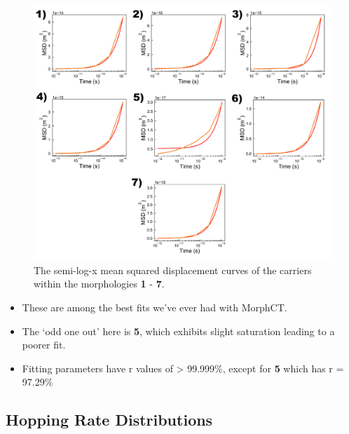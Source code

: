 \documentclass[12pt]{article}
\begin{document}
\begin{figure}[h!]\centering
	\includegraphics[width=\textwidth]{Figures/SemiLogMSDHole.pdf}
    \caption{The semi-log-x mean squared displacement curves of the carriers within the morphologies \textbf{1} - \textbf{7}.}
	\label{fig:MSD}
\end{figure}

\begin{itemize}
    \item{These are among the best fits we've ever had with MorphCT.}
    \item{The `odd one out' here is \textbf{5}, which exhibits slight saturation leading to a poorer fit.}
    \item{Fitting parameters have r values of > 99.999\%, except for \textbf{5} which has r = 97.29\%}
\end{itemize}

\clearpage

\subsection{Hopping Rate Distributions}
\end{document}
